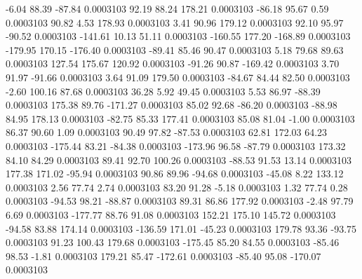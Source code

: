        -6.04       88.39      -87.84     0.0003103
       92.19       88.24      178.21     0.0003103
      -86.18       95.67        0.59     0.0003103
       90.82        4.53      178.93     0.0003103
        3.41       90.96      179.12     0.0003103
       92.10       95.97      -90.52     0.0003103
     -141.61       10.13       51.11     0.0003103
     -160.55      177.20     -168.89     0.0003103
     -179.95      170.15     -176.40     0.0003103
      -89.41       85.46       90.47     0.0003103
        5.18       79.68       89.63     0.0003103
      127.54      175.67      120.92     0.0003103
      -91.26       90.87     -169.42     0.0003103
        3.70       91.97      -91.66     0.0003103
        3.64       91.09      179.50     0.0003103
      -84.67       84.44       82.50     0.0003103
       -2.60      100.16       87.68     0.0003103
       36.28        5.92       49.45     0.0003103
        5.53       86.97      -88.39     0.0003103
      175.38       89.76     -171.27     0.0003103
       85.02       92.68      -86.20     0.0003103
      -88.98       84.95      178.13     0.0003103
      -82.75       85.33      177.41     0.0003103
       85.08       81.04       -1.00     0.0003103
       86.37       90.60        1.09     0.0003103
       90.49       97.82      -87.53     0.0003103
       62.81      172.03       64.23     0.0003103
     -175.44       83.21      -84.38     0.0003103
     -173.96       96.58      -87.79     0.0003103
      173.32       84.10       84.29     0.0003103
       89.41       92.70      100.26     0.0003103
      -88.53       91.53       13.14     0.0003103
      177.38      171.02      -95.94     0.0003103
       90.86       89.96      -94.68     0.0003103
      -45.08        8.22      133.12     0.0003103
        2.56       77.74        2.74     0.0003103
       83.20       91.28       -5.18     0.0003103
        1.32       77.74        0.28     0.0003103
      -94.53       98.21      -88.87     0.0003103
       89.31       86.86      177.92     0.0003103
       -2.48       97.79        6.69     0.0003103
     -177.77       88.76       91.08     0.0003103
      152.21      175.10      145.72     0.0003103
      -94.58       83.88      174.14     0.0003103
     -136.59      171.01      -45.23     0.0003103
      179.78       93.36      -93.75     0.0003103
       91.23      100.43      179.68     0.0003103
     -175.45       85.20       84.55     0.0003103
      -85.46       98.53       -1.81     0.0003103
      179.21       85.47     -172.61     0.0003103
      -85.40       95.08     -170.07     0.0003103
